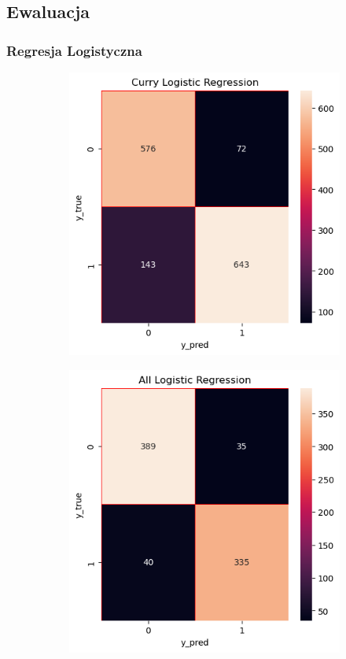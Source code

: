 \documentclass{beamer}
\begin{document}
	\subsection{Ewaluacja}

\begin{frame}
	\frametitle{Regresja Logistyczna}
	\begin{figure}
		\begin{subfigure}[b]{0.45\textwidth}
			\includegraphics[width=\linewidth, height=0.45\textheight]{E_Logistic1.png}
		\end{subfigure}
		\begin{subfigure}[b]{0.45\textwidth}
			\includegraphics[width=\linewidth, height=0.45\textheight]{E_Logistic_all.png}

\end{subfigure}
\end{figure}
\end{frame}
\end{document}
